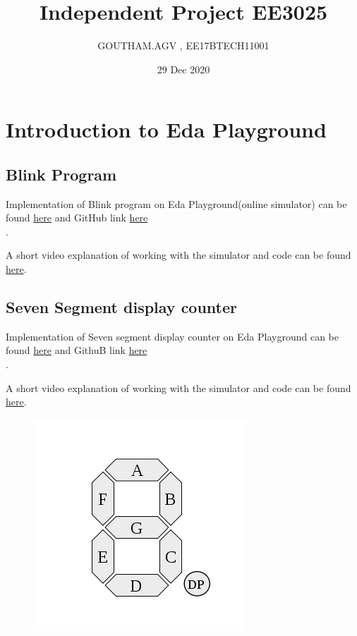 \documentclass{report}
\title{Independent Project EE3025}
\author{GOUTHAM.AGV , EE17BTECH11001}
\date{29 Dec 2020}
\begin{document}
\maketitle
\chapter{Introduction to Eda Playground}
\section {Blink Program}

\hspace*{0.5cm} Implementation of Blink program on Eda Playground(online simulator) can be found \href{https://www.edaplayground.com/x/esSx}{here} and GitHub link \href{https://github.com/gouthamagv/FFT-FPGA-GVV/tree/main/blink}{here}\\.\par
A short video explanation of working with the simulator and code can be found  \href{https://youtu.be/i72Db3KiXbg}{here}.
\section{Seven Segment display counter}
\hspace*{0.5cm}Implementation of Seven segment display counter on Eda Playground can be found \href{https://www.edaplayground.com/x/7YHZ}{here} and GithuB link \href{https://github.com/gouthamagv/FFT-FPGA-GVV/tree/main/7_segment_display}{here}\\.\par
A short video explanation of working with the simulator and code can be found  \href{https://youtu.be/yMpw_An-A4w}{here}.
\begin{figure}[h]
\includegraphics[scale=0.32]{B.png}
\centering
\end{figure}
\end{document}

